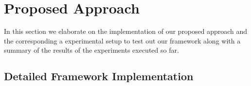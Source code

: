 \documentclass{mprop}
\begin{document}
\section{Proposed Approach}


In this section we elaborate on the implementation of our proposed approach and the corresponding a experimental setup to test out our framework along with a summary of the results of the experiments executed so far.

\subsection{Detailed Framework Implementation}
\end{document}
